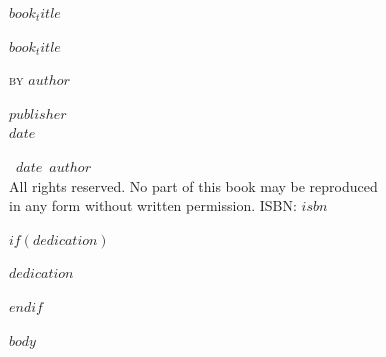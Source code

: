 \documentclass[12pt]{book}
\def\booktitle{$book_title$}
\def\bookauthor{$author$}
\def\bookdate{$date$}
\def\bookpublisher{$publisher$}
\begin{document}
\thispagestyle{empty}
\null\vfill
\begin{center}
{\Huge\scshape\booktitle}
\end{center}
\vfill\null

\clearpage
\thispagestyle{empty}
\begin{center}
\vspace*{1.5in}
{\Huge\scshape\booktitle\par}
\vspace{1in}
\bigskip
{\large\scshape by \bookauthor\par}
\vfill
{\large\scshape\bookpublisher}\\
\scshape\bookdate
\end{center}

\clearpage
\thispagestyle{empty}
\null\vfill
\begin{center}
\textcopyright\ \bookdate\ \bookauthor\\
\bigskip
All rights reserved. No part of this book may be reproduced\\
in any form without written permission.
\vfill
ISBN: $isbn$
\end{center}
\vfill\null

$if(dedication)$
\clearpage
\thispagestyle{empty}
\null\vfill
\begin{center}
\textit{$dedication$}
\end{center}
\vfill\null
$endif$

\clearpage
\tableofcontents

\listoffigures
\listoftables

\mainmatter

$body$

\backmatter

\end{document}
